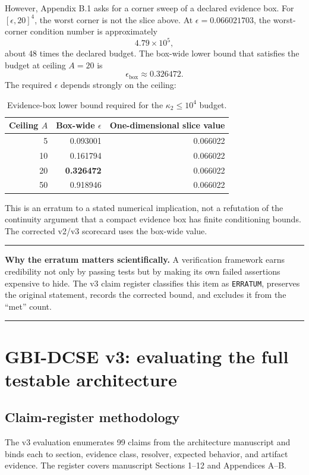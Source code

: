 \documentclass[11pt]{article}
\newenvironment{claimbox}{%
  \begin{center}\begin{minipage}{0.94\linewidth}\color{navy}\hrule\vspace{0.6em}\color{black}\small
}{%
  \vspace{0.5em}\color{navy}\hrule\end{minipage}\end{center}
}
\begin{document}
However, Appendix B.1 asks for a corner sweep of a declared evidence box. For \([\epsilon,20]^4\), the worst corner is not the slice above. At \(\epsilon=0.066021703\), the worst-corner condition number is approximately
\[
4.79\times10^5,
\]
about 48 times the declared budget. The box-wide lower bound that satisfies the budget at ceiling \(A=20\) is
\[
\boxed{\epsilon_{\mathrm{box}}\approx0.326472}.
\]
The required \(\epsilon\) depends strongly on the ceiling:

\begin{table}[H]
\centering
\caption{Evidence-box lower bound required for the \(\kappa_2\le10^4\) budget.}
\begin{tabular}{rrr}
\toprule
Ceiling \(A\) & Box-wide \(\epsilon\) & One-dimensional slice value\\
\midrule
5 & 0.093001 & 0.066022\\
10 & 0.161794 & 0.066022\\
20 & \textbf{0.326472} & 0.066022\\
50 & 0.918946 & 0.066022\\
\bottomrule
\end{tabular}
\end{table}

This is an erratum to a stated numerical implication, not a refutation of the continuity argument that a compact evidence box has finite conditioning bounds. The corrected v2/v3 scorecard uses the box-wide value.

\begin{claimbox}
\textbf{Why the erratum matters scientifically.} A verification framework earns credibility not only by passing tests but by making its own failed assertions expensive to hide. The v3 claim register classifies this item as \texttt{ERRATUM}, preserves the original statement, records the corrected bound, and excludes it from the ``met'' count.
\end{claimbox}

\section{GBI-DCSE v3: evaluating the full testable architecture}

\subsection{Claim-register methodology}

The v3 evaluation enumerates 99 claims from the architecture manuscript and binds each to section, evidence class, resolver, expected behavior, and artifact evidence. The register covers manuscript Sections 1--12 and Appendices A--B.
\end{document}
